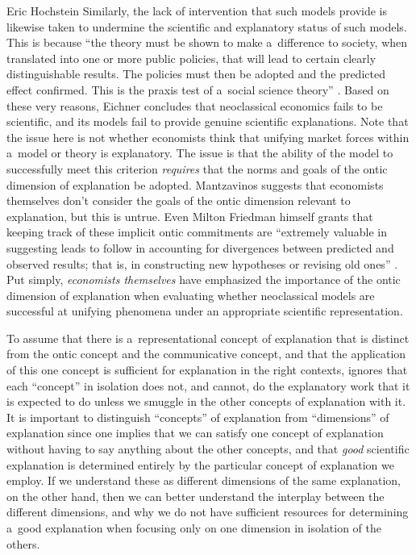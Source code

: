 \begin{artengenv}{Eric Hochstein}
Similarly, the lack of intervention that such models provide is likewise taken to undermine the scientific and explanatory status of such models. This is because ``the theory must be shown to make a~difference to society, when translated into one or more public policies, that will lead to certain clearly distinguishable results. The policies must then be adopted and the predicted effect confirmed. This is the praxis test of a~social science theory''
\parencite[][p.510]{eichner_why_1983}. %
 Based on these very reasons, Eichner concludes that neoclassical economics fails to be scientific, and its models fail to provide genuine scientific explanations. Note that the issue here is not whether economists think that unifying market forces within a~model or theory is explanatory. The issue is that the ability of the model to successfully meet this criterion \textit{requires} that the norms and goals of the ontic dimension of explanation be adopted. Mantzavinos suggests that economists themselves don't consider the goals of the ontic dimension relevant to explanation, but this is untrue. Even Milton Friedman himself grants that keeping track of these implicit ontic commitments are ``extremely valuable in suggesting leads to follow in accounting for divergences between predicted and observed results; that is, in constructing new hypotheses or revising old ones'' 
\parencite[][p.31n]{friedman_essays_1953}. %
 Put simply, \textit{economists themselves} have emphasized the importance of the ontic dimension of explanation when evaluating whether neoclassical models are successful at unifying phenomena under an appropriate scientific representation.

To assume that there is a~representational concept of explanation that is distinct from the ontic concept and the communicative concept, and that the application of this one concept is sufficient for explanation in the right contexts, ignores that each ``concept'' in isolation does not, and cannot, do the explanatory work that it is expected to do unless we smuggle in the other concepts of explanation with it. It is important to distinguish ``concepts'' of explanation from ``dimensions'' of explanation since one implies that we can satisfy one concept of explanation without having to say anything about the other concepts, and that \textit{good} scientific explanation is determined entirely by the particular concept of explanation we employ. If we understand these as different dimensions of the same explanation, on the other hand, then we can better understand the interplay between the different dimensions, and why we do not have sufficient resources for determining a~good explanation when focusing only on one dimension in isolation of the others.


\end{artengenv}
